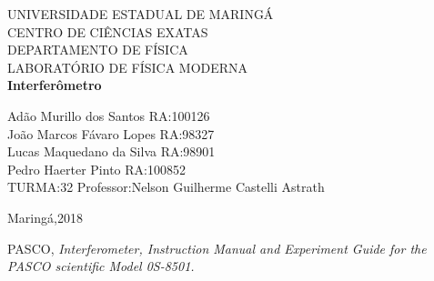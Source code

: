 \documentclass[a4paper,10pt]{article}
\begin{document}
	
	\begin{titlepage}
		\begin{center}
		{\large UNIVERSIDADE ESTADUAL DE MARINGÁ}\\[0.2cm]
		{\large CENTRO DE CIÊNCIAS EXATAS}\\[0.2cm]
		{\large DEPARTAMENTO DE FÍSICA}\\[0.2cm]
		{\large LABORATÓRIO DE FÍSICA MODERNA}\\[7.0cm]
		{\bf \huge Interferômetro}\\[7.0cm]
		\end{center}
	{\large Adão Murillo dos Santos \hfill RA:100126}\\[0.7cm]
	{\large João Marcos Fávaro Lopes \hfill RA:98327}\\[0.7cm]
	{\large Lucas Maquedano da Silva \hfill RA:98901}\\[0.7cm]
	{\large Pedro Haerter Pinto \hfill RA:100852}\\[0.7cm]
	{\large TURMA:32 \hfill Professor:Nelson Guilherme Castelli
	Astrath}
	
	\vfill
		\begin{center}
		{\large Maringá,2018}
		\end{center}
	\end{titlepage}

	\tableofcontents
	
	
		
	
\vspace{3cm}
	\begin{thebibliography}{1}
    	PASCO, \it{Interferometer}, Instruction Manual and Experiment Guide for the PASCO scientific Model 0S-8501.
	\end{thebibliography}	
	
\end{document}
